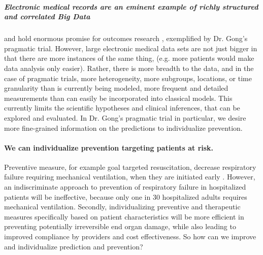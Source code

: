 \documentclass[11pt,notitlepage]{article}
\begin{document}
\subparagraph{Electronic medical records are an eminent example of richly structured and correlated Big Data} 
and hold enormous promise for outcomes research \cite{Dean_19279318,Amarasingham20940649},  exemplified by Dr. Gong's pragmatic trial. However, large electronic medical data sets are not just bigger in that there are more instances of the same thing, (e.g. more patients would make data analysis only easier).  Rather, there is more breadth to the data, and in the case of pragmatic trials, more heterogeneity, more subgroups, locations, or time granularity than is currently being modeled, more frequent and detailed measurements than can easily be incorporated into classical models.  This currently limits the scientific hypotheses and clinical inferences, that can be explored and evaluated. In Dr. Gong's pragmatic trial in particular, we desire more fine-grained information on the predictions to individualize prevention.  

\paragraph*{We can individualize prevention targeting patients at risk.}
Preventive measure, for example goal targeted resuscitation, decrease respiratory failure requiring mechanical ventilation, when they are initiated early \cite{Rivers_12594312}. However, an indiscriminate approach to prevention of respiratory failure in hospitalized patients will be ineffective, because only one in 30 hospitalized adults requires mechanical ventilation. Secondly, individualizing preventive and therapeutic measures specifically based on patient characteristics will be more efficient in preventing potentially irreversible end organ damage, while also  leading to improved compliance by providers and cost effectiveness. So how can we improve and individualize prediction and prevention? 
\end{document}
